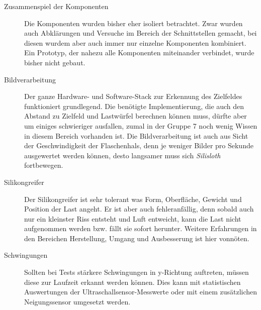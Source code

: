 \begin{description}
    \item[Zusammenspiel der Komponenten] Die Komponenten wurden bisher eher isoliert betrachtet. Zwar wurden auch Abklärungen und Versuche im Bereich der Schnittstellen gemacht, bei diesen wurdem aber auch immer nur einzelne Komponenten kombiniert. Ein Prototyp, der nahezu alle Komponenten miteinander verbindet, wurde bisher nicht gebaut.
    \item[Bildverarbeitung] Der ganze Hardware- und Software-Stack zur Erkennung des Zielfeldes funktioniert grundlegend. Die benötigte Implementierung, die auch den Abstand zu Zielfeld und Lastwürfel berechnen können muss, dürfte aber um einiges schwieriger ausfallen, zumal in der Gruppe 7 noch wenig Wissen in diesem Bereich vorhanden ist. Die Bildverarbeitung ist auch aus Sicht der Geschwindigkeit der Flaschenhals, denn je weniger Bilder pro Sekunde ausgewertet werden können, desto langsamer muss sich \textit{Silisloth} fortbewegen.
    \item[Silikongreifer] Der Silikongreifer ist sehr tolerant was Form, Oberfläche, Gewicht und Position der Last angeht. Er ist aber auch fehleranfällig, denn sobald auch nur ein kleinster Riss entsteht und Luft entweicht, kann die Last nicht aufgenommen werden bzw. fällt sie sofort herunter. Weitere Erfahrungen in den Bereichen Herstellung, Umgang und Ausbesserung ist hier vonnöten.
    \item[Schwingungen] Sollten bei Tests stärkere Schwingungen in y-Richtung auftreten, müssen diese zur Laufzeit erkannt werden können. Dies kann mit statistischen Auswertungen der Ultraschall\-sen\-sor-Messwerte oder mit einem zusätzlichen Neigungssensor umgesetzt werden.
\end{description}
